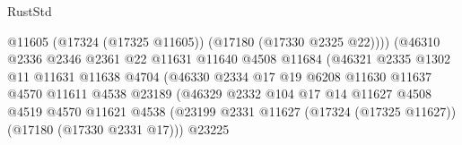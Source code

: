 \begin{lexlean}{RustStd}
\begin{coremodule}
                                              @11605
                                              (@17324 (@17325 @11605))
                                              (@17180 (@17330 @2325 @22))))
                                          (@46310
                                            @2336
                                            @2346
                                            @2361
                                            @22
                                            @11631
                                            @11640
                                            @4508
                                            @11684
                                            (@46321
                                              @2335
                                              @1302
                                              @11
                                              @11631
                                              @11638
                                              @4704
                                              (@46330
                                                @2334
                                                @17
                                                @19
                                                @6208
                                                @11630
                                                @11637
                                                @4570
                                                @11611
                                                @4538
                                                @23189
                                                (@46329
                                                  @2332
                                                  @104
                                                  @17
                                                  @14
                                                  @11627
                                                  @4508
                                                  @4519
                                                  @4570
                                                  @11621
                                                  @4538
                                                  (@23199
                                                    @2331
                                                    @11627
                                                    (@17324 (@17325 @11627))
                                                    (@17180 (@17330 @2331 @17)))
                                                  @23225

\end{coremodule}
\end{lexlean}

